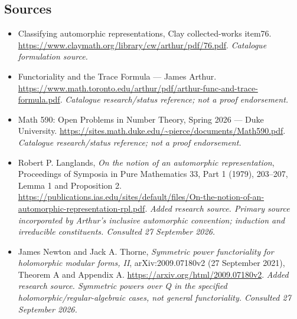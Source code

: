 \documentclass[11pt,a4paper]{article}
\begin{document}
\subsection{Sources}
\begin{itemize}\raggedright
\item[\textnormal{[S1]}]\hypertarget{source:statement:1}{} Classifying automorphic representations, Clay collected-works item76.
\url{https://www.claymath.org/library/cw/arthur/pdf/76.pdf}.
{\small\textit{Catalogue formulation source.}}
\item[\textnormal{[S2]}]\hypertarget{source:statement:2}{} Functoriality and the Trace Formula — James Arthur.
\url{https://www.math.toronto.edu/arthur/pdf/arthur-func-and-trace-formula.pdf}.
{\small\textit{Catalogue research/status reference; not a proof endorsement.}}
\item[\textnormal{[S3]}]\hypertarget{source:statement:3}{} Math 590: Open Problems in Number Theory, Spring 2026 — Duke University.
\url{https://sites.math.duke.edu/~pierce/documents/Math590.pdf}.
{\small\textit{Catalogue research/status reference; not a proof endorsement.}}
\item[\textnormal{[E1]}]\hypertarget{extra:statement:1}{} Robert P. Langlands, \emph{On the notion of an automorphic representation}, Proceedings of Symposia in Pure Mathematics 33, Part 1 (1979), 203--207, Lemma 1 and Proposition 2.
\url{https://publications.ias.edu/sites/default/files/On-the-notion-of-an-automorphic-representation-rpl.pdf}.
{\small\textit{Added research source. Primary source incorporated by Arthur's inclusive automorphic convention; induction and irreducible constituents. Consulted 27 September 2026.}}
\item[\textnormal{[E2]}]\hypertarget{extra:statement:2}{} James Newton and Jack A. Thorne, \emph{Symmetric power functoriality for holomorphic modular forms, II}, arXiv:2009.07180v2 (27 September 2021), Theorem A and Appendix A.
\url{https://arxiv.org/html/2009.07180v2}.
{\small\textit{Added research source. Symmetric powers over Q in the specified holomorphic/regular-algebraic cases, not general functoriality. Consulted 27 September 2026.}}
\end{itemize}

\end{document}
